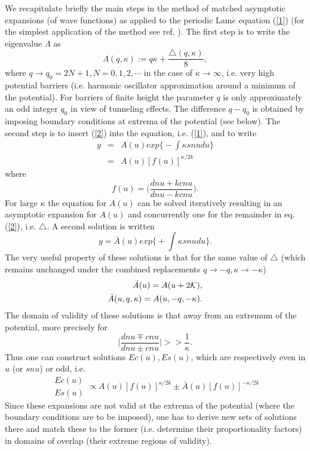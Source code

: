 \documentclass[a4paper,12pt,a4]{article}
\begin{document}
We recapitulate briefly the main steps in the method
of matched asymptotic expansions (of wave functions)
as applied to the periodic Lam${\acute e}$ equation (\ref{1})
(for the simplest application of the method see ref. \cite{9}).
The first step is to write the eigenvalue $\Lambda $
as \begin{equation}
\Lambda (q,\kappa):=q\kappa +\frac{\triangle(q,\kappa)}{8},
\label{2}
\end{equation}
where $q\rightarrow q_0=2N+1, N= 0,1,2,\cdots $ in the
case of $\kappa\rightarrow\infty$, i.e.  very high potential barriers
(i.e. harmonic oscillator approximation around a minimum
of the potential).  For barriers of finite height the parameter
$q$ is only approximately an odd integer $q_0$ in view
of tunneling effects.  The difference
$q-q_0$ is obtained by
imposing boundary conditions at
extrema of the potential (see below).
The second step is to insert (\ref{2}) into the equation, i.e. (\ref{1}),
and to write
\begin{eqnarray}
y&=&A(u) exp\bigg\{-\int\kappa sn u du\bigg\}\nonumber\\
&=&A(u) [f(u)]^{\kappa/2k}
\label{3}
\end{eqnarray}
where
$$
f(u) = \bigg(\frac{dn u + k cn u}{dn u - k cn u}\bigg).
$$
For large $\kappa$ the equation for $A(u)$ can be solved iteratively resulting
in an asymptotic expansion for $A(u)$ and concurrently one
for the remainder in eq. (\ref{2}), i.e. $\triangle $. A second
solution is written
\begin{equation}
y={\bar A}(u) exp\bigg\{+\int\kappa sn u du\bigg\}.
\label{4}
\end{equation}
The very useful property of these solutions is that for the
same value of $\triangle$ (which remains unchanged under
the combined replacements $q\rightarrow -q,
\kappa\rightarrow -\kappa$)
\begin{eqnarray}
{\bar A}(u) = A(u+2{\cal K}),\nonumber\\
{\bar A}(u,q,\kappa) = A(u, -q, -\kappa).
\label{5}
\end{eqnarray}
The domain of validity of these solutions
is that away from an extremum of the potential,
more precisely for
 $$
\bigg|\frac{dn u \mp cn u}{dn u \pm cn u}\bigg|>>\frac{1}{\kappa}.
$$
Thus one can construct solutions $Ec(u), Es(u)$, which
are respectively even in $u$ (or $sn u$) or odd, i.e.
\begin{equation}
\begin{array}{r } Ec(u) \\ Es(u)\end{array}
\propto A(u)[f(u)]^{\kappa/2k} \pm {\bar A}(u)[f(u)]^{-\kappa/2k}
\label{6}
\end{equation}
Since these expansions are not valid at the extrema of the
potential (where the boundary conditions are to be
imposed), one has to derive new sets of solutions there
and match these to the former
(i.e. determine their proportionality factors) in domains
of overlap (their extreme regions of validity).
\end{document}
